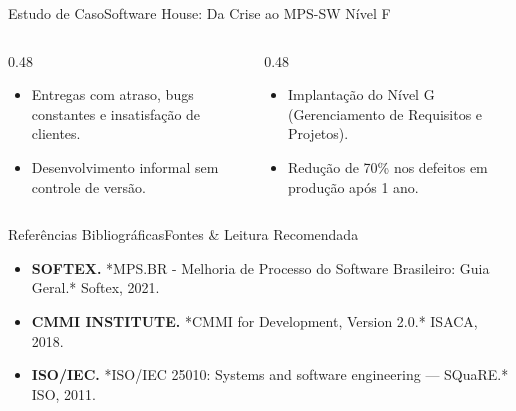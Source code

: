 \begin{senaiframe}{Estudo de Caso}{Software House: Da Crise ao MPS-SW Nível F}
  \begin{columns}[t]
    \begin{column}{0.48\textwidth}
      \begin{tcolorbox}[senairedcard, title={Cenário Inicial}]
        \begin{itemize}
          \item Entregas com atraso, bugs constantes e insatisfação de clientes.
          \item Desenvolvimento informal sem controle de versão.
        \end{itemize}
      \end{tcolorbox}
    \end{column}
    \begin{column}{0.48\textwidth}
      \begin{tcolorbox}[senaigreencard, title={Evolução com MPS-SW}]
        \begin{itemize}
          \item Implantação do Nível G (Gerenciamento de Requisitos e Projetos).
          \item Redução de 70\% nos defeitos em produção após 1 ano.
        \end{itemize}
      \end{tcolorbox}
    \end{column}
  \end{columns}
\end{senaiframe}

\begin{senaiframe}{Referências Bibliográficas}{Fontes \& Leitura Recomendada}
  \vspace{0.5cm}
  \begin{tcolorbox}[senaicard, title={Obras de Referência}]
    \begin{itemize}
      \item \textbf{SOFTEX.} *MPS.BR - Melhoria de Processo do Software Brasileiro: Guia Geral.* Softex, 2021.
      \item \textbf{CMMI INSTITUTE.} *CMMI for Development, Version 2.0.* ISACA, 2018.
      \item \textbf{ISO/IEC.} *ISO/IEC 25010: Systems and software engineering — SQuaRE.* ISO, 2011.
    \end{itemize}
  \end{tcolorbox}
\end{senaiframe}

